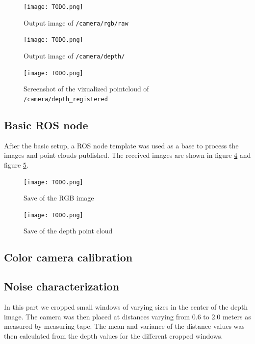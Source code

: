 \documentclass[DIV12,a4paper]{scrartcl}
\begin{document}
\begin{figure}
  \centering
  \texttt{[image: TODO.png]}
  \caption{Output image of \texttt{/camera/rgb/raw}}
  \label{fig:rgb-raw}
\end{figure}

\begin{figure}[h!tbp]
  \centering
  \texttt{[image: TODO.png]}
  \caption{Output image of \texttt{/camera/depth/}}
  \label{fig:depth}
\end{figure}

\begin{figure}[h!tbp]
  \centering
  \texttt{[image: TODO.png]}
  \caption{Screenshot of the vizualized pointcloud of \texttt{/camera/depth\_registered}}
  \label{fig:depth_registered}
\end{figure}

\subsection{Basic ROS node}
\label{sec:basic-ros}
After the basic setup, a ROS node template was used as a base to process the images and point clouds published. The received images are shown in figure \ref{fig:rgb-save} and figure \ref{fig:depth-save}.

\begin{figure}[h!tbp]
  \centering
  \texttt{[image: TODO.png]}
  \caption{Save of the RGB image}
  \label{fig:rgb-save}
\end{figure}

\begin{figure}[h!tbp]
  \centering
  \texttt{[image: TODO.png]}
  \caption{Save of the depth point cloud}
  \label{fig:depth-save}
\end{figure}

\subsection{Color camera calibration}
\label{sec:calibration}

\newpage
\subsection{Noise characterization}
\label{sec:noise_characterization}
In this part we cropped small windows of varying sizes in the center of the depth image. The camera was then placed at distances varying from 0.6 to 2.0 meters as measured by measuring tape. The mean and variance of the distance values was then calculated from the depth values for the different cropped windows.
\end{document}
